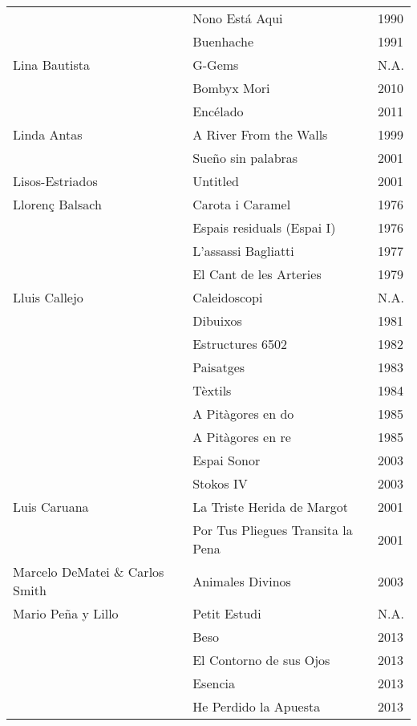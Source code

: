 \begin{center}
\begin{longtable}{ p{}  p{}  p{} }
& Nono Está Aqui & 1990 \\ \cmidrule (r){2-3} 
& Buenhache & 1991 \\ \midrule 
Lina Bautista & G-Gems & N.A.\\ \cmidrule (r){2-3} 
& Bombyx Mori & 2010 \\ \cmidrule (r){2-3} 
& Encélado & 2011 \\ \midrule 
Linda Antas & A River From the Walls & 1999 \\ \cmidrule (r){2-3} 
& Sueño sin palabras & 2001 \\ \midrule 
Lisos-Estriados & Untitled & 2001 \\ \midrule 
Llorenç Balsach & Carota i Caramel & 1976 \\ \cmidrule (r){2-3} 
& Espais residuals (Espai I) & 1976 \\ \cmidrule (r){2-3} 
& L'assassi Bagliatti & 1977 \\ \cmidrule (r){2-3}  
& El Cant de les Arteries & 1979 \\ \midrule 
Lluis Callejo & Caleidoscopi & N.A. \\ \cmidrule (r){2-3} 
& Dibuixos & 1981 \\ \cmidrule (r){2-3} 
& Estructures 6502 & 1982 \\ \cmidrule (r){2-3} 
& Paisatges & 1983 \\ \cmidrule (r){2-3} 
& Tèxtils & 1984 \\ \cmidrule (r){2-3} 
& A Pitàgores en do & 1985 \\ \cmidrule (r){2-3} 
& A Pitàgores en re & 1985 \\ \cmidrule (r){2-3} 
& Espai Sonor & 2003 \\ \cmidrule (r){2-3} 
& Stokos IV & 2003 \\ \midrule 
Luis Caruana & La Triste Herida de Margot & 2001 \\ \cmidrule (r){2-3} 
& Por Tus Pliegues Transita la Pena & 2001 \\ \midrule 
Marcelo DeMatei \& Carlos Smith & Animales Divinos & 2003 \\ \midrule 
Mario Peña y Lillo & Petit Estudi & N.A. \\ \cmidrule (r){2-3} 
& Beso & 2013 \\ \cmidrule (r){2-3} 
& El Contorno de sus Ojos & 2013 \\ \cmidrule (r){2-3} 
& Esencia & 2013 \\ \cmidrule (r){2-3} 
& He Perdido la Apuesta & 2013 \\ \cmidrule (r){2-3} 

\end{longtable}
\end{center}
